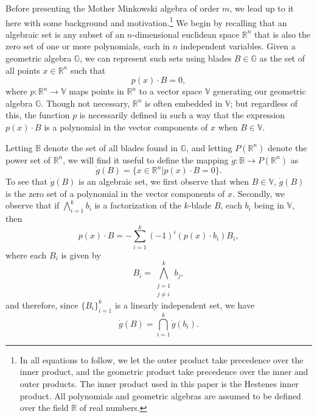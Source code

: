 \documentclass{birkjour}
\theoremstyle{definition}
\theoremstyle{remark}
\numberwithin{equation}{section}
\newcommand{\R}{\mathbb{R}}
\newcommand{\B}{\mathbb{B}}
\newcommand{\G}{\mathbb{G}}
\newcommand{\V}{\mathbb{V}}
\newcommand{\gd}{\dot{g}}
\begin{document}
Before presenting the Mother Minkowski algebra of order $m$, we lead up to it here with
some background and motivation.\footnote{In all equations to follow, we let the
outer product take precedence over the inner product, and the geometric product
take precedence over the inner and outer products.  The inner product used in this
paper is the Hestenes inner product.  All polynomials and geometric algebras are assumed
to be defined over the field $\R$ of real numbers.}
We begin by recalling that an algebraic set is any 
subset of an $n$-dimensional euclidean space $\R^n$ that is also the zero set of one
or more polynomials, each in $n$ independent variables.  Given a geometric algebra $\G$, we can represent such sets
using blades $B\in\G$ as the set of all points $x\in\R^n$ such that
\begin{equation*}
p(x)\cdot B=0,
\end{equation*}
where $p:\R^n\to\V$ maps points in $\R^n$ to a vector space $\V$ generating
our geometric algebra $\G$.  Though not necessary, $\R^n$ is often embedded in $\V$;
but regardless of this, the function $p$ is necessarily defined in such a way that the expression
$p(x)\cdot B$ is a polynomial in the vector components of $x$ when $B\in\V$.

Letting $\B$ denote the set of all blades found in $\G$,
and letting $P(\R^n)$ denote the power set of $\R^n$,
we will find it useful to define the mapping $\gd:\B\to P(\R^n)$ as
\begin{equation}\label{equ_gd}
\gd(B) = \{x\in\R^n|p(x)\cdot B=0\}.
\end{equation}
To see that $\gd(B)$ is an algebraic set, we first observe that when $B\in\V$,
$\gd(B)$ is the zero set of a polynomial in the vector components of $x$.
Secondly, we observe that if $\bigwedge_{i=1}^k b_i$ is a factorization
of the $k$-blade $B$, each $b_i$ being in $\V$, then
\begin{equation}\label{equ_expand_p_dot_B}
p(x)\cdot B = -\sum_{i=1}^k (-1)^i (p(x)\cdot b_i)B_i,
\end{equation}
where each $B_i$ is given by
\begin{equation*}
B_i = \bigwedge_{\substack{j=1\\j\neq i}}^k b_j,
\end{equation*}
and therefore, since $\{B_i\}_{i=1}^k$ is a linearly independent set, we have
\begin{equation*}
\gd(B) = \bigcap_{i=1}^k \gd(b_i).
\end{equation*}
\end{document}
